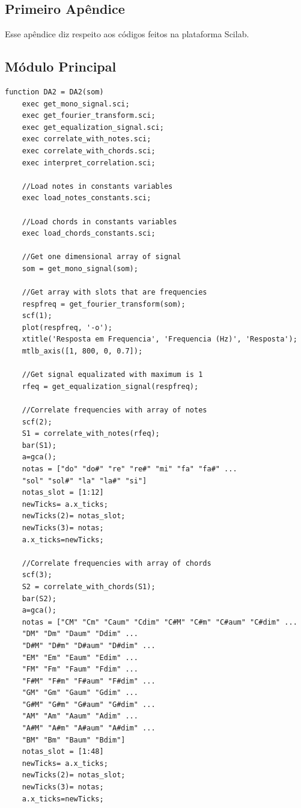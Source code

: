 \begin{apendicesenv}

\partapendices

\chapter{Primeiro Apêndice}

Esse apêndice diz respeito aos códigos feitos na plataforma Scilab.

\section{Módulo Principal}
\label{sec:moduloprincipal}
\begin{lstlisting} 
function DA2 = DA2(som)
	exec get_mono_signal.sci;
	exec get_fourier_transform.sci;
	exec get_equalization_signal.sci;
	exec correlate_with_notes.sci;
	exec correlate_with_chords.sci;
	exec interpret_correlation.sci;

	//Load notes in constants variables
	exec load_notes_constants.sci;

	//Load chords in constants variables
	exec load_chords_constants.sci;

	//Get one dimensional array of signal 
	som = get_mono_signal(som);

	//Get array with slots that are frequencies 
	respfreq = get_fourier_transform(som);
	scf(1); 
	plot(respfreq, '-o');
	xtitle('Resposta em Frequencia', 'Frequencia (Hz)', 'Resposta');
	mtlb_axis([1, 800, 0, 0.7]);

	//Get signal equalizated with maximum is 1
	rfeq = get_equalization_signal(respfreq);

	//Correlate frequencies with array of notes
	scf(2);
	S1 = correlate_with_notes(rfeq);
	bar(S1);
	a=gca();
	notas = ["do" "do#" "re" "re#" "mi" "fa" "fa#" ...
	"sol" "sol#" "la" "la#" "si"]
	notas_slot = [1:12]
	newTicks= a.x_ticks;
	newTicks(2)= notas_slot;
	newTicks(3)= notas;
	a.x_ticks=newTicks;

	//Correlate frequencies with array of chords
	scf(3);
	S2 = correlate_with_chords(S1);
	bar(S2);
	a=gca();
	notas = ["CM" "Cm" "Caum" "Cdim" "C#M" "C#m" "C#aum" "C#dim" ...
	"DM" "Dm" "Daum" "Ddim" ... 
	"D#M" "D#m" "D#aum" "D#dim" ... 
	"EM" "Em" "Eaum" "Edim" ... 
	"FM" "Fm" "Faum" "Fdim" ... 
	"F#M" "F#m" "F#aum" "F#dim" ...
	"GM" "Gm" "Gaum" "Gdim" ...
	"G#M" "G#m" "G#aum" "G#dim" ...
	"AM" "Am" "Aaum" "Adim" ... 
	"A#M" "A#m" "A#aum" "A#dim" ... 
	"BM" "Bm" "Baum" "Bdim"]
	notas_slot = [1:48]
	newTicks= a.x_ticks;
	newTicks(2)= notas_slot;
	newTicks(3)= notas;
	a.x_ticks=newTicks;


\end{lstlisting}
\end{apendicesenv}
